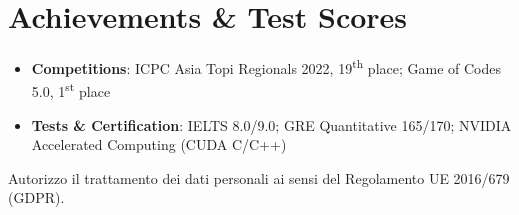 \documentclass[letterpaper,10pt]{article}
\newcommand{\resumeItemPlain}[1]{
  \item\small{
    {#1 \vspace{-2pt}}
  }
}
\newcommand{\resumeSubHeadingListStart}{\begin{itemize}[leftmargin=*]}
\newcommand{\resumeSubHeadingListEnd}{\end{itemize}}
\begin{document}
\section{Achievements \& Test Scores}
  \resumeSubHeadingListStart
    \resumeItemPlain{\textbf{Competitions}: ICPC Asia Topi Regionals 2022, 19\textsuperscript{th} place; Game of Codes 5.0, 1\textsuperscript{st} place}
    \resumeItemPlain{\textbf{Tests \& Certification}: IELTS 8.0/9.0; GRE Quantitative 165/170; NVIDIA Accelerated Computing (CUDA C/C++)}
  \resumeSubHeadingListEnd

\vspace{2pt}
\begin{center}
\scriptsize Autorizzo il trattamento dei dati personali ai sensi del Regolamento UE 2016/679 (GDPR).
\end{center}

\end{document}
